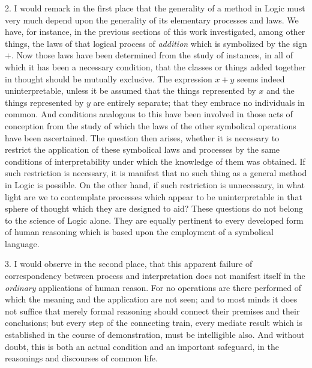 \documentclass[oneside]{book}
\begin{document}
2. I would remark in the first place that the generality of a
method in Logic must very much depend upon the generality of
its elementary processes and laws. We have, for instance, in the
previous sections of this work investigated, among other things,
the laws of that logical process of \textit{addition} which is symbolized
by the sign $+$. Now those laws have been determined from the
study of instances, in all of which it has been a necessary condition,
that the classes or things added together in thought should
be mutually exclusive. The expression $x + y$ seems indeed uninterpretable,
unless it be assumed that the things represented
by $x$ and the things represented by $y$ are entirely separate;
that they embrace no individuals in common. And conditions
analogous to this have been involved in those acts of conception
from the study of which the laws of the other symbolical operations
have been ascertained. The question then arises, whether
it is necessary to restrict the application of these symbolical laws
and processes by the same conditions of interpretability under
which the knowledge of them was obtained. If such restriction
is necessary, it is manifest that no such thing as a general
method in Logic is possible. On the other hand, if such restriction is unnecessary, in what light are we to contemplate processes
which appear to be uninterpretable in that sphere of thought
which they are designed to aid? These questions do not belong
to the science of Logic alone. They are equally pertinent to every
developed form of human reasoning which is based upon the
employment of a symbolical language.

3. I would observe in the second place, that this apparent
failure of correspondency between process and interpretation does
not manifest itself in the \emph{ordinary} applications of human reason.
For no operations are there performed of which the meaning
and the application are not seen; and to most minds it does
not suffice that merely formal reasoning should connect their
premises and their conclusions; but every step of the connecting
train, every mediate result which is established in the course of
demonstration, must be intelligible also. And without doubt,
this is both an actual condition and an important safeguard, in
the reasonings and discourses of common life.
\end{document}
